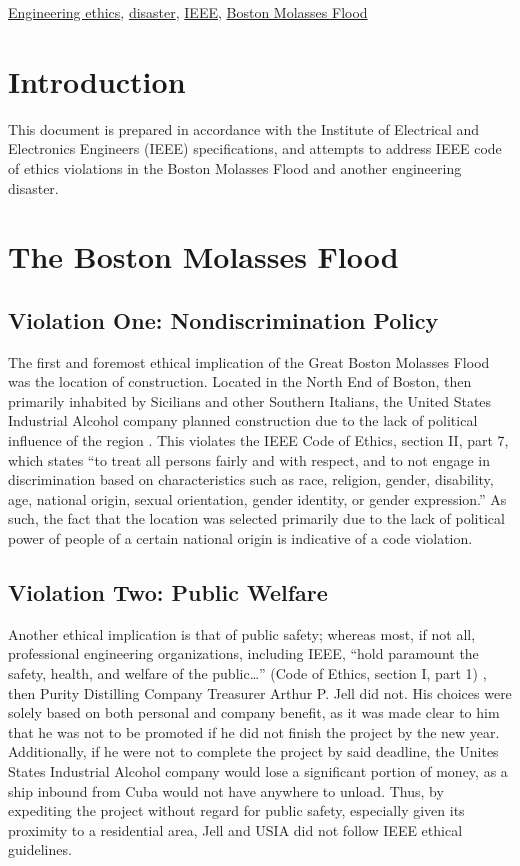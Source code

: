 \documentclass[conference]{IEEEtran}
\begin{document}
\begin{IEEEkeywords}
  \underline{Engineering ethics}, \underline{disaster}, \underline{IEEE}, \underline{Boston Molasses Flood}
\end{IEEEkeywords}

\section{Introduction}
This document is prepared in accordance with the Institute of Electrical and Electronics Engineers (IEEE) specifications, and attempts to address IEEE code of ethics violations in the Boston Molasses Flood and another engineering disaster.

\section{The Boston Molasses Flood}

\subsection{Violation One: Nondiscrimination Policy}

The first and foremost ethical implication of the Great Boston Molasses Flood was the location of construction. Located in the North End of Boston, then primarily inhabited by Sicilians and other Southern Italians, the United States Industrial Alcohol company planned construction due to the lack of political influence of the region \cite{b1}. This violates the IEEE Code of Ethics, section II, part 7, which states ``to treat all persons fairly and with respect, and to not engage in discrimination based on characteristics such as race, religion, gender, disability, age, national origin, sexual orientation, gender identity, or gender expression.'' As such, the fact that the location was selected primarily due to the lack of political power of people of a certain national origin is indicative of a code violation.

\subsection{Violation Two: Public Welfare}

Another ethical implication is that of public safety; whereas most, if not all, professional engineering organizations, including IEEE, ``hold paramount the safety, health, and welfare of the public\dots'' (Code of Ethics, section I, part 1) \cite{b3}, then Purity Distilling Company Treasurer Arthur P. Jell did not. His choices were solely based on both personal and company benefit, as it was made clear to him that he was not to be promoted if he did not finish the project by the new year. Additionally, if he were not to complete the project by said deadline, the Unites States Industrial Alcohol company would lose a significant portion of money, as a ship inbound from Cuba would not have anywhere to unload. Thus, by expediting the project without regard for public safety, especially given its proximity to a residential area, Jell and USIA did not follow IEEE ethical guidelines. 
\end{document}
